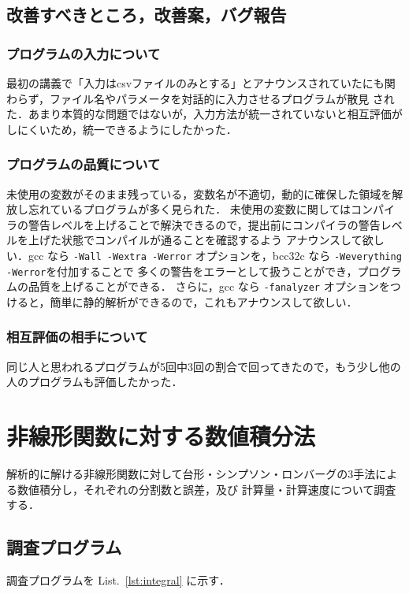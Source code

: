 \documentclass[gutter=20mm,fore-edge=20mm,head_space=30mm,foot_space=30mm]{jlreq}
\begin{document}
\subsection{改善すべきところ，改善案，バグ報告}
\subsubsection{プログラムの入力について}
最初の講義で「入力はcsvファイルのみとする」とアナウンスされていたにも関わらず，ファイル名やパラメータを対話的に入力させるプログラムが散見
された．あまり本質的な問題ではないが，入力方法が統一されていないと相互評価がしにくいため，統一できるようにしたかった．


\subsubsection{プログラムの品質について}
未使用の変数がそのまま残っている，変数名が不適切，動的に確保した領域を解放し忘れているプログラムが多く見られた．
未使用の変数に関してはコンパイラの警告レベルを上げることで解決できるので，提出前にコンパイラの警告レベルを上げた状態でコンパイルが通ることを確認するよう
アナウンスして欲しい．gcc なら \verb|-Wall -Wextra -Werror| オプションを，bcc32c なら \verb|-Weverything -Werror|を付加することで
多くの警告をエラーとして扱うことができ，プログラムの品質を上げることができる．
さらに，gcc なら \verb|-fanalyzer| オプションをつけると，簡単に静的解析ができるので，これもアナウンスして欲しい．

\subsubsection{相互評価の相手について}
同じ人と思われるプログラムが5回中3回の割合で回ってきたので，もう少し他の人のプログラムも評価したかった．

\section{非線形関数に対する数値積分法}
解析的に解ける非線形関数に対して台形・シンプソン・ロンバーグの3手法による数値積分し，それぞれの分割数と誤差，及び
計算量・計算速度について調査する．

\subsection{調査プログラム}
調査プログラムを List.~\ref{lst:integral} に示す．
\end{document}
